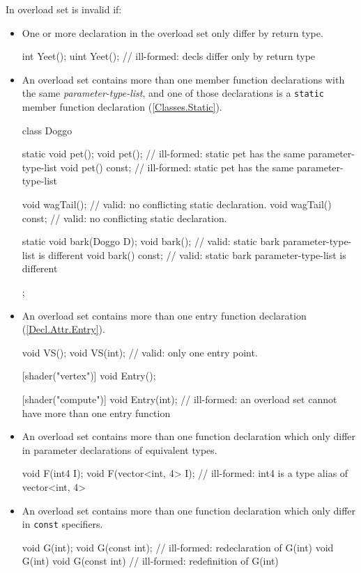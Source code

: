 \p In overload set is invalid if:
\begin{itemize}
  \item One or more declaration in the overload set only differ by return type.
\begin{HLSL}
int Yeet();
uint Yeet(); // ill-formed: decls differ only by return type
\end{HLSL}

  \item An overload set contains more than one member function declarations with
  the same \textit{parameter-type-list}, and one of those declarations is a
  \texttt{static} member function declaration (\ref{Classes.Static}).
\begin{HLSL}
class Doggo {
  static void pet();
  void pet();              // ill-formed: static pet has the same parameter-type-list
  void pet() const;        // ill-formed: static pet has the same parameter-type-list

  void wagTail();          // valid: no conflicting static declaration.
  void wagTail() const;    // valid: no conflicting static declaration.

  static void bark(Doggo D);
  void bark();             // valid: static bark parameter-type-list is different
  void bark() const;       // valid: static bark parameter-type-list is different
};
\end{HLSL}

  \item An overload set contains more than one \gls{entry function} declaration
  (\ref{Decl.Attr.Entry}).
\begin{HLSL}
void VS();
void VS(int);              // valid: only one entry point.

[shader("vertex")]
void Entry();

[shader("compute")]
void Entry(int);           // ill-formed: an overload set cannot have more than one entry function
\end{HLSL}

  \item An overload set contains more than one function declaration which only
  differ in parameter declarations of equivalent types.
\begin{HLSL}
void F(int4 I);
void F(vector<int, 4> I);  // ill-formed: int4 is a type alias of vector<int, 4>
\end{HLSL}

  \item An overload set contains more than one function declaration which only
  differ in \texttt{const} specifiers.
\begin{HLSL}
void G(int);
void G(const int);         // ill-formed: redeclaration of G(int)
void G(int) {}
void G(const int) {}       // ill-formed: redefinition of G(int)
\end{HLSL}


\end{itemize}
